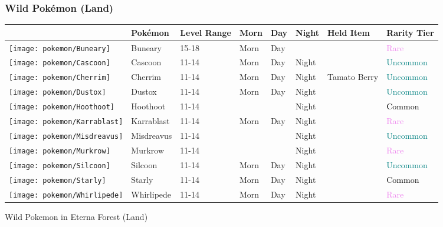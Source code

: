 \subsubsection{Wild Pokémon (Land)}%
\label{ssubsec:WildPokmon(Land)}%
\begin{longtable}{||l l l l l l l l||}%
\hline%
&Pokémon&Level Range&Morn&Day&Night&Held Item&Rarity Tier\\%
\hline%
\endhead%
\hline%
\texttt{[image: pokemon/Buneary]}&Buneary&15{-}18&Morn&Day&&&\textcolor{violet}{%
Rare%
}\\%
\hline%
\texttt{[image: pokemon/Cascoon]}&Cascoon&11{-}14&Morn&Day&Night&&\textcolor{teal}{%
Uncommon%
}\\%
\hline%
\texttt{[image: pokemon/Cherrim]}&Cherrim&11{-}14&Morn&Day&Night&Tamato Berry&\textcolor{teal}{%
Uncommon%
}\\%
\hline%
\texttt{[image: pokemon/Dustox]}&Dustox&11{-}14&Morn&Day&Night&&\textcolor{teal}{%
Uncommon%
}\\%
\hline%
\texttt{[image: pokemon/Hoothoot]}&Hoothoot&11{-}14&&&Night&&\textcolor{black}{%
Common%
}\\%
\hline%
\texttt{[image: pokemon/Karrablast]}&Karrablast&11{-}14&Morn&Day&Night&&\textcolor{violet}{%
Rare%
}\\%
\hline%
\texttt{[image: pokemon/Misdreavus]}&Misdreavus&11{-}14&&&Night&&\textcolor{teal}{%
Uncommon%
}\\%
\hline%
\texttt{[image: pokemon/Murkrow]}&Murkrow&11{-}14&&&Night&&\textcolor{violet}{%
Rare%
}\\%
\hline%
\texttt{[image: pokemon/Silcoon]}&Silcoon&11{-}14&Morn&Day&Night&&\textcolor{teal}{%
Uncommon%
}\\%
\hline%
\texttt{[image: pokemon/Starly]}&Starly&11{-}14&Morn&Day&Night&&\textcolor{black}{%
Common%
}\\%
\hline%
\texttt{[image: pokemon/Whirlipede]}&Whirlipede&11{-}14&Morn&Day&Night&&\textcolor{violet}{%
Rare%
}\\%
\hline%
\end{longtable}%
\caption{Wild Pokemon in Eterna Forest (Land)}